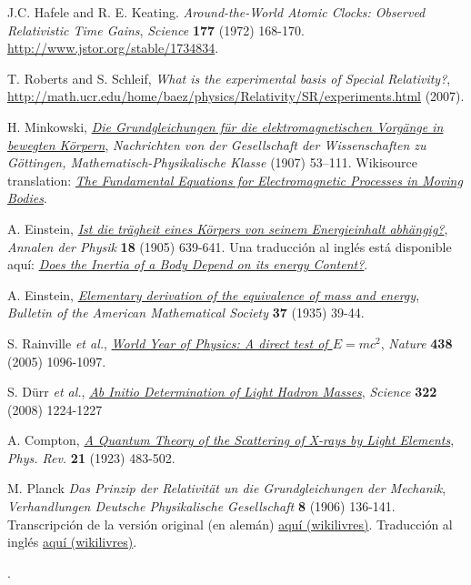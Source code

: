 \begin{thebibliography}{99}
 J.C. Hafele and R. E. Keating. {\it Around-the-World Atomic Clocks: Observed Relativistic Time Gains}, {\sl Science} {\bf 177} (1972) 168-170. \url{http://www.jstor.org/stable/1734834}.

 T. Roberts and S. Schleif, {\it What is the experimental basis of Special Relativity?},  \url{http://math.ucr.edu/home/baez/physics/Relativity/SR/experiments.html} (2007).

 H. Minkowski, \href{http://de.wikisource.org/wiki/Die_Grundgleichungen_f\%C3\%BCr_die_elektromagnetischen_Vorg\%C3\%A4nge_in_bewegten_K\%C3\%B6rpern}{\it Die Grundgleichungen f\"ur die elektromagnetischen Vorgänge in bewegten Körpern}, {\sl Nachrichten von der Gesellschaft der Wissenschaften zu Göttingen, Mathematisch-Physikalische Klasse} (1907) 53–111. Wikisource translation: \href{http://en.wikisource.org/wiki/The_Fundamental_Equations_for_Electromagnetic_Processes_in_Moving_Bodies}{\it The Fundamental Equations for Electromagnetic Processes in Moving Bodies}.

 A. Einstein, \href{https://doi.org/10.1002\%2Fandp.19053231314}{\textit{Ist die trägheit eines Körpers von seinem Energieinhalt abhängig?}}, {\sl Annalen der Physik} {\bf 18} (1905) 639-641. Una traducción al inglés está disponible aquí: \href{{https://www.fourmilab.ch/etexts/einstein/E_mc2/e_mc2.pdf}}{\textit{Does the Inertia of a Body Depend on its energy Content?}}.

 A. Einstein, \href{http://www.ams.org/journals/bull/2000-37-01/S0273-0979-99-00805-8/S0273-0979-99-00805-8.pdf}
{\textit{Elementary derivation of the equivalence of mass and energy}}, {\sl Bulletin of the American Mathematical Society} {\bf 37} (1935) 39-44.

 S. Rainville \textit{et al.}, \href{https://doi.org/10.1038/4381096a}{\it World Year of Physics: A direct test of $E=mc^2$}, {\sl Nature} {\bf 438} (2005) 1096-1097.

 S. Dürr \textit{et al.}, \href{https://doi.org/10.1126/science.1163233}{\it Ab Initio Determination of Light Hadron Masses}, {\sl Science} {\bf 322} (2008) 1224-1227

 A. Compton, \href{http://prola.aps.org/abstract/PR/v21/i5/p483_1}{\it A Quantum Theory of the Scattering of X-rays by Light Elements}, {\sl Phys. Rev.} {\bf 21} (1923) 483-502.

 M. Planck {\it Das Prinzip der Relativität un die Grundgleichungen der Mechanik}, {\sl Verhandlungen Deutsche Physikalische Gesellschaft} {\bf 8} (1906) 136-141. Transcripción de la versión original (en alemán) \href{http://wikilivres.ca/wiki/Das_Prinzip_der_Relativit\%C3\%A4t_und_die_Grundgleichungen_der_Mechanik}{aquí (wikilivres)}. Traducción al inglés  \href{http://en.wikisource.org/wiki/Translation:The_Principle_of_Relativity_and_the_Fundamental_Equations_of_Mechanics}{aquí (wikilivres)}.

\end{thebibliography}.
